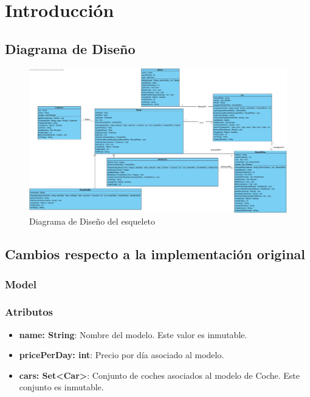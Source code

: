 \section{Introducción}

\subsection{Diagrama de Diseño}

\begin{figure}[H]
    \centering
     \includegraphics[width=1\linewidth]{assets/Esqueleto.jpg}
     \caption{Diagrama de Diseño del esqueleto}
\end{figure}

\subsection{Cambios respecto a la implementación original}

\subsubsection{Model}

\subsubsection*{Atributos}

\begin{itemize}
    \item \textbf{name: String}: Nombre del modelo. Este valor es inmutable.
    \item \textbf{pricePerDay: int}: Precio por día asociado al modelo.
    \item \textbf{cars: Set<Car>}: Conjunto de coches asociados al modelo de Coche. Este conjunto es  inmutable.
\end{itemize}

